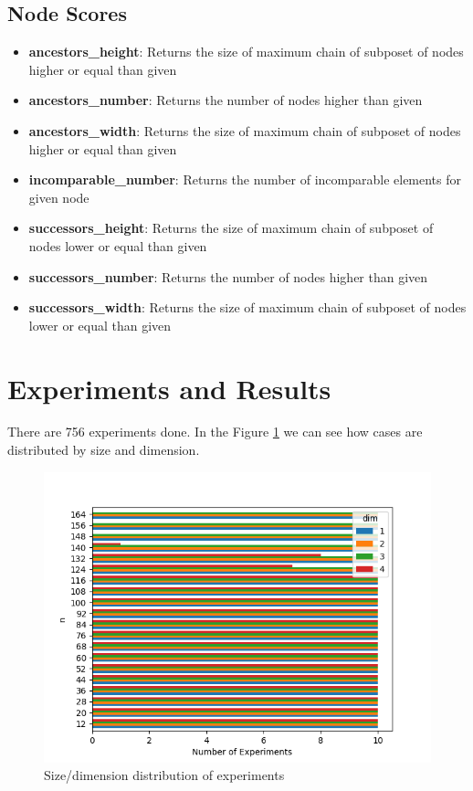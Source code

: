 \documentclass{article}
\begin{document}
\subsection{Node Scores}
\begin{itemize}
\item \textbf{ancestors\_height}: Returns the size of maximum chain of subposet of nodes higher or equal than given
\item \textbf{ancestors\_number}: Returns the number of nodes higher than given
\item \textbf{ancestors\_width}: Returns the size of maximum chain of subposet of nodes higher or equal than given
\item \textbf{incomparable\_number}: Returns the number of incomparable elements for given node
\item \textbf{successors\_height}: Returns the size of maximum chain of subposet of nodes lower or equal than given
\item \textbf{successors\_number}: Returns the number of nodes higher than given
\item \textbf{successors\_width}: Returns the size of maximum chain of subposet of nodes lower or equal than given
\end{itemize}

\section{Experiments and Results}
\par There are 756 experiments done. In the Figure \ref{fig:cases_distribution} we can see how cases are distributed by size and dimension.
\begin{figure}[ht]
  \centering
  \includegraphics[width=\textwidth]{pics/scores - cases.png}
  \caption{Size/dimension distribution of experiments}
  \label{fig:cases_distribution}
\end{figure}
\end{document}
